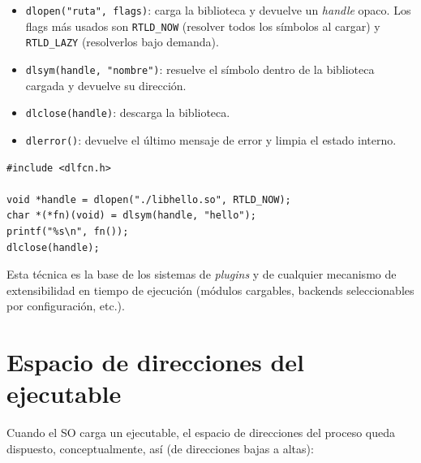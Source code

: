 \documentclass[11pt,a4paper]{article}
\begin{document}
\begin{itemize}[leftmargin=*]
    \item \texttt{dlopen("ruta", flags)}: carga la biblioteca y
        devuelve un \emph{handle} opaco. Los flags más usados son
        \texttt{RTLD\_NOW} (resolver todos los símbolos al cargar) y
        \texttt{RTLD\_LAZY} (resolverlos bajo demanda).
    \item \texttt{dlsym(handle, "nombre")}: resuelve el símbolo
        dentro de la biblioteca cargada y devuelve su dirección.
    \item \texttt{dlclose(handle)}: descarga la biblioteca.
    \item \texttt{dlerror()}: devuelve el último mensaje de error y
        limpia el estado interno.
\end{itemize}

\begin{lstlisting}[style=cstyle]
#include <dlfcn.h>

void *handle = dlopen("./libhello.so", RTLD_NOW);
char *(*fn)(void) = dlsym(handle, "hello");
printf("%s\n", fn());
dlclose(handle);
\end{lstlisting}

Esta técnica es la base de los sistemas de \emph{plugins} y de
cualquier mecanismo de extensibilidad en tiempo de ejecución
(módulos cargables, backends seleccionables por configuración, etc.).

\section{Espacio de direcciones del ejecutable}

Cuando el SO carga un ejecutable, el espacio de direcciones del
proceso queda dispuesto, conceptualmente, así (de direcciones bajas
a altas):

\begin{center}
\end{center}
\end{document}
